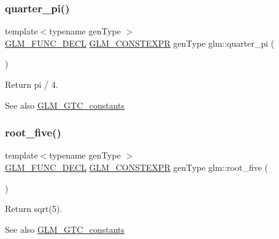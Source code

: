 \subsubsection{\texorpdfstring{quarter\+\_\+pi()}{quarter\_pi()}}
{\footnotesize\ttfamily template$<$typename gen\+Type $>$ \\
\mbox{\hyperlink{setup_8hpp_ab2d052de21a70539923e9bcbf6e83a51}{G\+L\+M\+\_\+\+F\+U\+N\+C\+\_\+\+D\+E\+CL}} \mbox{\hyperlink{setup_8hpp_a08b807947b47031d3a511f03f89645ad}{G\+L\+M\+\_\+\+C\+O\+N\+S\+T\+E\+X\+PR}} gen\+Type glm\+::quarter\+\_\+pi (\begin{DoxyParamCaption}{ }\end{DoxyParamCaption})}

Return pi / 4. \begin{DoxySeeAlso}{See also}
\mbox{\hyperlink{group__gtc__constants}{G\+L\+M\+\_\+\+G\+T\+C\+\_\+constants}} 
\end{DoxySeeAlso}
\mbox{\label{group__gtc__constants_gae9ebbded75b53d4faeb1e4ef8b3347a2}} 
\subsubsection{\texorpdfstring{root\+\_\+five()}{root\_five()}}
{\footnotesize\ttfamily template$<$typename gen\+Type $>$ \\
\mbox{\hyperlink{setup_8hpp_ab2d052de21a70539923e9bcbf6e83a51}{G\+L\+M\+\_\+\+F\+U\+N\+C\+\_\+\+D\+E\+CL}} \mbox{\hyperlink{setup_8hpp_a08b807947b47031d3a511f03f89645ad}{G\+L\+M\+\_\+\+C\+O\+N\+S\+T\+E\+X\+PR}} gen\+Type glm\+::root\+\_\+five (\begin{DoxyParamCaption}{ }\end{DoxyParamCaption})}

Return sqrt(5). \begin{DoxySeeAlso}{See also}
\mbox{\hyperlink{group__gtc__constants}{G\+L\+M\+\_\+\+G\+T\+C\+\_\+constants}} 
\end{DoxySeeAlso}
\mbox{\label{group__gtc__constants_ga4e276cb823cc5e612d4f89ed99c75039}} 
